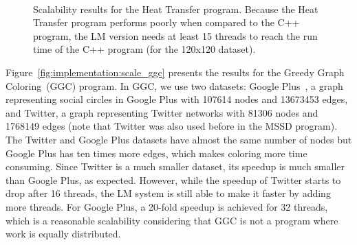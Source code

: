 \begin{figure}[]
\begin{subfigure}[b]{\plotsize\textwidth}
                \label{fig:implementation:scale_ht120}
        \end{subfigure}\\
        \caption{Scalability results for the Heat Transfer program. Because the
           Heat Transfer program performs poorly when compared to the C++ program,
           the LM version needs at least 15 threads to reach the run time of the C++
           program (for the 120x120 dataset).}
        \label{fig:implementation:scale_ht}
\end{figure}

Figure~\ref{fig:implementation:scale_ggc} presents the results for the Greedy
Graph Coloring~(GGC) program. In GGC, we use two datasets: Google
Plus~\cite{snapnets}, a graph representing social circles in Google Plus with
107614 nodes and 13673453 edges, and Twitter, a graph representing Twitter
networks with 81306 nodes and 1768149 edges (note that Twitter was also used
before in the MSSD program). The Twitter and Google Plus datasets have almost
the same number of nodes but Google Plus has ten times more edges, which makes
coloring more time consuming. Since Twitter is a much smaller dataset, its
speedup is much smaller than Google Plus, as expected. However, while the
speedup of Twitter starts to drop after 16 threads, the LM system is still able
to make it faster by adding more threads. For Google Plus, a 20-fold speedup is
achieved for 32 threads, which is a reasonable scalability considering that GGC
is not a program where work is equally distributed.

